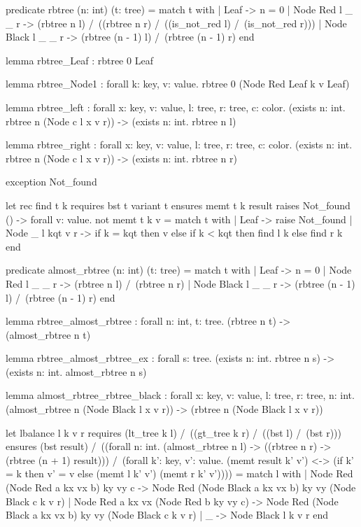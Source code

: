 \begin{whylang}
  predicate rbtree (n: int) (t: tree) =
 match t with
 | Leaf -> n = 0
 | Node Red l _ _ r -> 
  (rbtree n l) /\ ((rbtree n r) /\ ((is_not_red l) /\ (is_not_red r)))
 | Node Black l _ _ r -> 
  (rbtree (n - 1) l) /\ (rbtree (n - 1) r)
  end

  lemma rbtree_Leaf : 
  rbtree 0 Leaf

  lemma rbtree_Node1 : 
  forall k: key, v: value. rbtree 0 (Node Red Leaf k v Leaf)

  lemma rbtree_left : 
  forall x: key, v: value, l: tree, r: tree, c: color. 
  (exists n: int. rbtree n (Node c l x v r)) -> (exists n: int. rbtree n l)

  lemma rbtree_right : 
  forall x: key, v: value, l: tree, r: tree, c: color. 
  (exists n: int. rbtree n (Node c l x v r)) -> (exists n: int. rbtree n r)

  exception Not_found

  let rec find t k
  requires { bst t }
  variant { t }
  ensures { memt t k result }
  raises { Not_found () -> forall v: value. not memt t k v } 
 = match t with
  | Leaf -> raise Not_found
  | Node _ l kqt v r -> if k = kqt then v else if k < kqt then find l k else find r k
  end

  predicate almost_rbtree (n: int) (t: tree) =
 match t with
 | Leaf -> n = 0
 | Node Red l _ _ r -> (rbtree n l) /\ (rbtree n r)
 | Node Black l _ _ r -> (rbtree (n - 1) l) /\ (rbtree (n - 1) r)
  end

  lemma rbtree_almost_rbtree : 
  forall n: int, t: tree. (rbtree n t) -> (almost_rbtree n t)

  lemma rbtree_almost_rbtree_ex : 
  forall s: tree. (exists n: int. rbtree n s) -> (exists n: int. almost_rbtree n s)

  lemma almost_rbtree_rbtree_black : 
  forall x: key, v: value, l: tree, r: tree, n: int. 
  (almost_rbtree n (Node Black l x v r)) -> (rbtree n (Node Black l x v r))

  let lbalance l k v r
  requires { (lt_tree k l) /\ ((gt_tree k r) /\ ((bst l) /\ (bst r))) }
  ensures { (bst result) /\ 
  ((forall n: int. (almost_rbtree n l) -> ((rbtree n r) -> (rbtree (n + 1) result))) /\ 
  (forall k': key, v': value. (memt result k' v') <-> (if k' = k then v' = v else (memt l k' v') \/ 
  (memt r k' v')))) } 
 = match l with
  | Node Red (Node Red a kx vx b) ky vy c -> Node Red (Node Black a kx vx b) ky vy (Node Black c k v r)
  | Node Red a kx vx (Node Red b ky vy c) -> Node Red (Node Black a kx vx b) ky vy (Node Black c k v r)
  | _ -> Node Black l k v r
  end


\end{whylang}
